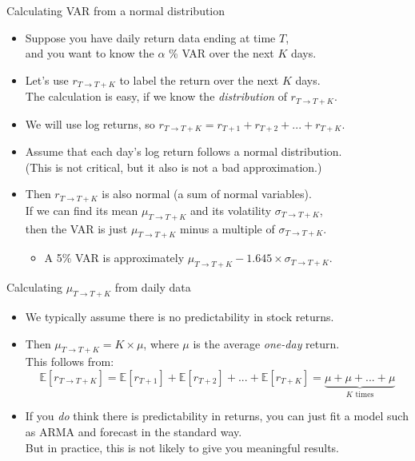 \documentclass[t,12pt]{beamer}
\begin{document}
\begin{frame}[c]{Calculating VAR from a normal distribution}
\begin{itemize}
\item Suppose you have daily return data ending at time $T$,
\\ and you want to know the $\alpha$ \% VAR over the next $K$ days.
\smallskip
\item Let's use $r_{T \to T+K}$ to label the return over the next $K$ days.
\\ The calculation is easy, if we know the \emph{distribution} of $r_{T \to T+K}$.
\smallskip
\item We will use log returns, so $r_{T\to T+K} = r_{T+1} + r_{T+2} + ... + r_{T+K}$.
\smallskip
\item Assume that each day's log return follows a normal distribution.
\\ \hfill {\footnotesize (This is not critical, but it also is not a bad approximation.)}
\smallskip
\item Then $r_{T \to T+K}$ is also normal (a sum of normal variables).
\\ If we can find its mean $\mu_{T \to T+K}$ and its volatility $\sigma_{T \to T+K}$,
\\ then the VAR is just $\mu_{T \to T+K}$ minus a multiple of $\sigma_{T \to T+K}$.
\begin{itemize}
\item A 5\% VAR is approximately $\mu_{T \to T+K} - 1.645\times\sigma_{T \to T+K}$.
\end{itemize}
\end{itemize}
\end{frame}

\begin{frame}[c]{Calculating $\mu_{T \to T+K}$ from daily data}
\begin{itemize}
\item We typically assume there is no predictability in stock returns. 
\medskip
\item Then $\mu_{T \to T+K} = K \times \mu$, where $\mu$ is the average \emph{one-day} return.
\\ \medskip This follows from:
$$
\mathbb{E}[r_{T \to T+K}] = \mathbb{E}[r_{T+1}] + \mathbb{E}[r_{T+2}] + ... + \mathbb{E}[r_{T+K}] = \underbrace{\mu + \mu + ... + \mu}_{\text{$K$ times}}
$$
\item If you \emph{do} think there is predictability in returns, you can just fit a model such as ARMA and forecast in the standard way. 
\\ But in practice, this is not likely to give you meaningful results.
\end{itemize}
\end{frame}
\end{document}
